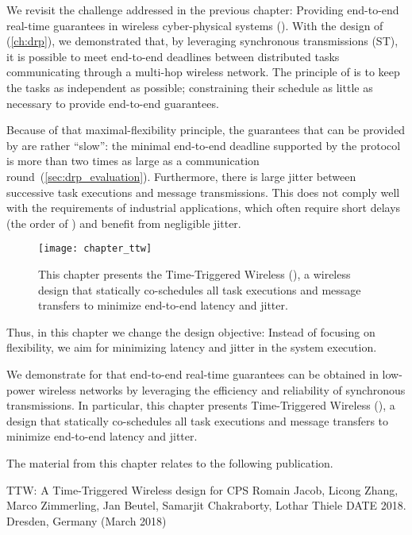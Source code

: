 

We revisit the challenge addressed in the previous chapter: Providing end-to-end real-time guarantees in wireless cyber-physical systems (\CPS).
With the design of \DRP (\cref{ch:drp}), we demonstrated that, by leveraging synchronous transmissions (ST), it is possible to meet end-to-end deadlines between distributed tasks communicating through a multi-hop wireless network.
The principle of \DRP is to keep the tasks as independent as possible; \ie constraining their schedule as little as necessary to provide end-to-end guarantees.

Because of that maximal-flexibility principle, the guarantees that can be provided by \DRP are rather ``slow'': the minimal end-to-end deadline supported by the protocol is more than two times as large as a communication round~(\cref{sec:drp_evaluation}).
Furthermore, there is large jitter between successive task executions and message transmissions.
This does not comply well with the requirements of industrial \CPS applications, which often require short delays (the order of \ms) and benefit from negligible jitter.

\begin{figure}
  \centering
  \texttt{[image: chapter\_ttw]}
  \caption{This chapter presents the Time-Triggered Wireless (\TTW), a wireless \CPS design that statically co-schedules all task executions and message transfers to minimize end-to-end latency and jitter.}
  \label{fig:chapter_ttw}
\end{figure}

Thus, in this chapter we change the design objective: Instead of focusing on flexibility, we aim for minimizing latency and jitter in the system execution.

We demonstrate for that end-to-end real-time guarantees can be obtained in low-power wireless networks by leveraging the efficiency and reliability of synchronous transmissions.
In particular, this chapter presents Time-Triggered Wireless (\TTW), a design that statically co-schedules all task executions and message transfers to minimize end-to-end latency and jitter.

\pagebreak
\begin{publi}

  The material from this chapter relates to the following publication.

  \inlineRef%
  {TTW: A Time-Triggered Wireless design for CPS}%
  {Romain Jacob, Licong Zhang, Marco Zimmerling, Jan Beutel, Samarjit Chakraborty, Lothar Thiele}%
  {DATE 2018. Dresden, Germany (March 2018)}

\end{publi}
